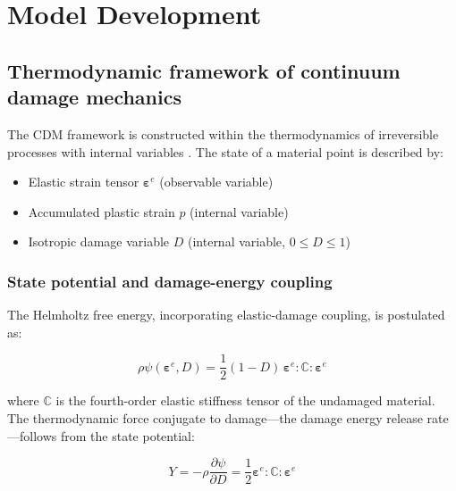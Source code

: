 \section{Model Development}
\label{sec:model}

\subsection{Thermodynamic framework of continuum damage mechanics}

The CDM framework is constructed within the thermodynamics of irreversible processes with internal variables \cite{lemaitre1992course}. The state of a material point is described by:

\begin{itemize}
    \item Elastic strain tensor $\boldsymbol{\varepsilon}^e$ (observable variable)
    \item Accumulated plastic strain $p$ (internal variable)
    \item Isotropic damage variable $D$ (internal variable, $0 \le D \le 1$)
\end{itemize}

\subsubsection{State potential and damage-energy coupling}

The Helmholtz free energy, incorporating elastic-damage coupling, is postulated as:

\begin{equation}
\rho\psi(\boldsymbol{\varepsilon}^e, D) = \frac{1}{2}(1-D) \, \boldsymbol{\varepsilon}^e : \mathbb{C} : \boldsymbol{\varepsilon}^e
\label{eq:free_energy}
\end{equation}

where $\mathbb{C}$ is the fourth-order elastic stiffness tensor of the undamaged material. The thermodynamic force conjugate to damage---the damage energy release rate---follows from the state potential:

\begin{equation}
Y = -\rho\frac{\partial\psi}{\partial D} = \frac{1}{2}\boldsymbol{\varepsilon}^e : \mathbb{C} : \boldsymbol{\varepsilon}^e
\label{eq:damage_force}
\end{equation}

